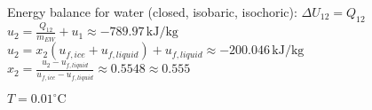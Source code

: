 Energy balance for water (closed, isobaric, isochoric):  
\( \Delta U_{12} = Q_{12} \)  
\( u_2 = \frac{Q_{12}}{m_{EW}} + u_1 \approx -789.97 \, \text{kJ/kg} \)  
\( u_2 = x_2 (u_{f,ice} + u_{f,liquid}) + u_{f,liquid} \approx -200.046 \, \text{kJ/kg} \)  
\( x_2 = \frac{u_2 - u_{f,liquid}}{u_{f,ice} - u_{f,liquid}} \approx 0.5548 \approx 0.555 \)  

\( T = 0.01^\circ \text{C} \)